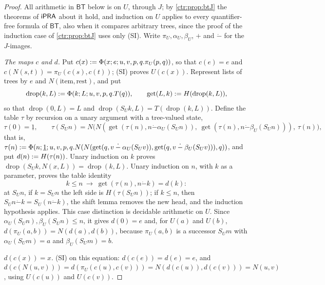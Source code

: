 \begin{proof}
All arithmetic in $\mathsf{BT}$ below is on $U$, through $J$; by \cref{ctr:prop:btJ} the
theorems of $\mathsf{iPRA}$ about it hold, and induction on $U$ applies to every quantifier-free
formula of $\mathsf{BT}$, also when it compares arbitrary trees, since the proof of the
induction case of \cref{ctr:prop:btJ} uses only (SI). Write $\pi_U,\alpha_U,\beta_U$,
$+$ and $\mathbin{\dot-}$ for the $J$-images.

\emph{The maps $c$ and $d$.} Put $c(x)\mathrel{:=}\Phi(x;e;u,v,p,q.\pi_U(p,q))$, so that $c(e)=e$ and
$c(N(s,t))=\pi_U(c(s),c(t))$; (SI) proves $U(c(x))$. Represent lists of trees by $e$ and
$N(\text{item},\text{rest})$, and put
\[
 \operatorname{drop}(k,L)\mathrel{:=}\Phi(k;L;u,v,p,q.T(q)),\qquad
 \operatorname{get}(L,k)\mathrel{:=} H(\operatorname{drop}(k,L)),
\]
so that $\operatorname{drop}(0,L)=L$ and $\operatorname{drop}(S_Uk,L)=T(\operatorname{drop}(k,L))$.
Define the table $\tau$ by recursion on a unary argument with a tree-valued state,
\[
 \tau(0)=\underline 1,\qquad
 \tau(S_Un)=N\bigl(N(\operatorname{get}(\tau(n),n\mathbin{\dot-}\alpha_U(S_Un)),\
 \operatorname{get}(\tau(n),n\mathbin{\dot-}\beta_U(S_Un))),\ \tau(n)\bigr),
\]
that is, $\tau(n)\mathrel{:=}\Phi(n;\underline 1;u,v,p,q.N(N(\operatorname{get}(q,v\mathbin{\dot-}\alpha_U(S_Uv)),\operatorname{get}(q,v\mathbin{\dot-}\beta_U(S_Uv))),q))$,
and put $d(n)\mathrel{:=} H(\tau(n))$. Unary induction on $k$ proves
$\operatorname{drop}(S_Uk,N(x,L))=\operatorname{drop}(k,L)$.
Unary induction on $n$, with $k$ as a parameter, proves the table identity
\[
 k\le n\ \to\ \operatorname{get}(\tau(n),n\mathbin{\dot-}k)=d(k):
\]
at $S_Un$, if $k=S_Un$ the left side is $H(\tau(S_Un))$; if $k\le n$, then
$S_Un\mathbin{\dot-}k=S_U(n\mathbin{\dot-}k)$, the shift lemma removes the new head, and the
induction hypothesis applies. This case distinction is decidable arithmetic on $U$. Since
$\alpha_U(S_Un),\beta_U(S_Un)\le n$, it gives $d(0)=e$ and, for $U(a)$ and $U(b)$,
$d(\pi_U(a,b))=N(d(a),d(b))$, because $\pi_U(a,b)$ is a successor $S_Um$ with
$\alpha_U(S_Um)=a$ and $\beta_U(S_Um)=b$.

\emph{$d(c(x))=x$.} (SI) on this equation: $d(c(e))=d(e)=e$, and
$d(c(N(u,v)))=d(\pi_U(c(u),c(v)))=N(d(c(u)),d(c(v)))=N(u,v)$, using $U(c(u))$ and $U(c(v))$.


\end{proof}
